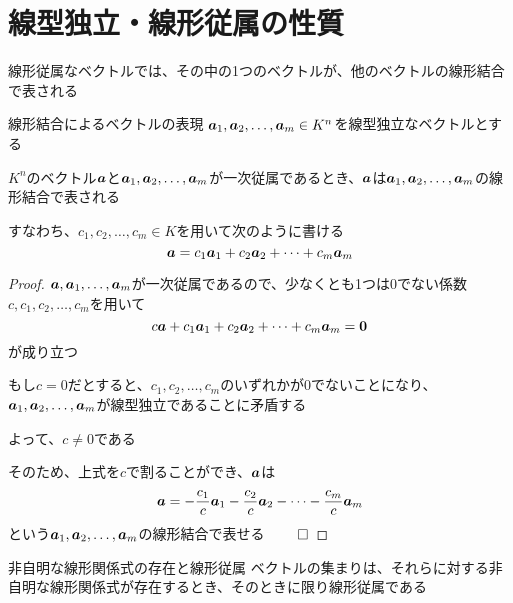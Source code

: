 \documentclass[../../../topic_linear-algebra]{subfiles}
\begin{document}
\sectionline
\section{線型独立・線形従属の性質}


\br

線形従属なベクトルでは、その中の1つのベクトルが、他のベクトルの線形結合で表される

\begin{theorem}{線形結合によるベクトルの表現}\label{thm:dep-vec-is-lincomb}
  $\vb*{a}_1, \vb*{a}_2, \dots, \vb*{a}_m \in K^n$を線型独立なベクトルとする

  $K^n$のベクトル$\vb*{a}$と$\vb*{a}_1, \vb*{a}_2, \dots, \vb*{a}_m$が一次従属であるとき、$\vb*{a}$は$\vb*{a}_1, \vb*{a}_2, \dots, \vb*{a}_m$の線形結合で表される

  すなわち、$c_1, c_2, \dots, c_m \in K$を用いて次のように書ける
  \begin{equation*}
    \vb*{a} = c_1 \vb*{a}_1 + c_2 \vb*{a}_2 + \cdots + c_m \vb*{a}_m
  \end{equation*}
\end{theorem}

\begin{proof}
  $\vb*{a}, \vb*{a}_1,\dots, \vb*{a}_m$が一次従属であるので、少なくとも1つは0でない係数$c, c_1, c_2, \dots, c_m$を用いて
  \begin{equation*}
    c \vb*{a} + c_1 \vb*{a}_1 + c_2 \vb*{a}_2 + \cdots + c_m \vb*{a}_m = \vb*{0}
  \end{equation*}
  が成り立つ

  もし$c=0$だとすると、$c_1,c_2,\dots,c_m$のいずれかが0でないことになり、$\vb*{a}_1, \vb*{a}_2, \dots, \vb*{a}_m$が線型独立であることに矛盾する

  よって、$c \neq 0$である

  そのため、上式を$c$で割ることができ、$\vb*{a}$は
  \begin{equation*}
    \vb*{a} = -\frac{c_1}{c} \vb*{a}_1 - \frac{c_2}{c} \vb*{a}_2 - \cdots - \frac{c_m}{c} \vb*{a}_m
  \end{equation*}
  という$\vb*{a}_1, \vb*{a}_2, \dots, \vb*{a}_m$の線形結合で表せる $\qed$
\end{proof}

\sectionline

\begin{theorem}{非自明な線形関係式の存在と線形従属}
  ベクトルの集まりは、それらに対する非自明な線形関係式が存在するとき、そのときに限り線形従属である
\end{theorem}
\end{document}
